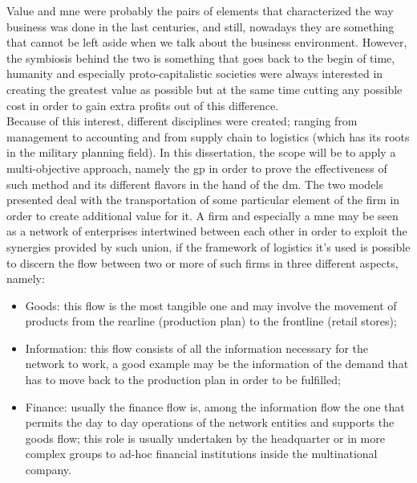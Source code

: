 \begin{doublespace}
Value and \gls{mne} were probably the pairs of elements that characterized the way business was done in the last centuries, and still, nowadays they are something that cannot be left aside when we talk about the business environment. However, the symbiosis behind the two is something that goes back to the begin of time, humanity and especially proto-capitalistic societies were always interested in creating the greatest value as possible but at the same time cutting any possible cost in order to gain extra profits out of this difference.
\\
Because of this interest, different disciplines were created; ranging from management to accounting and from supply chain to logistics (which has its roots in the military planning field). In this dissertation, the scope will be to apply a multi-objective approach, namely the \gls{gp} in order to prove the effectiveness of such method and its different flavors in the hand of the \gls{dm}. The two models presented deal with the transportation of some particular element of the firm in order to create additional value for it. A firm and especially a \gls{mne} may be seen as a network of enterprises intertwined between each other in order to exploit the synergies provided by such union, if the framework of logistics it's used is possible to discern the flow between two or more of such firms in three different aspects, namely:

\begin{itemize}
 \item Goods: this flow is the most tangible one and may involve the movement of products from the rearline (production plan) to the frontline (retail stores);    
\item Information: this flow consists of all the information necessary for the network to work, a good example may be the information of the demand that has to move back to the production plan in order to be fulfilled;
\item Finance: usually the finance flow is, among the information flow the one that permits the day to day operations of the network entities and supports the goods flow; this role is usually undertaken by the headquarter or in more complex groups to ad-hoc financial institutions inside the multinational company. 
\end{itemize}


\end{doublespace}
